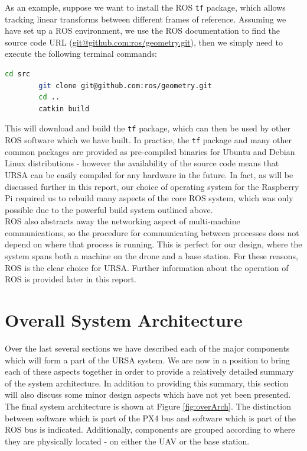 \documentclass[capstone_report.tex]{subfiles}
\begin{document}
    As an example, suppose we want to install the ROS \texttt{tf} package, which allows tracking linear transforms between different frames of reference. Assuming we have set up a ROS environment, we use the ROS documentation to find the source code URL (\url{git@github.com:ros/geometry.git}), then we simply need to execute the following terminal commands:

    \begin{lstlisting}[language=bash]
    	cd src
    	git clone git@github.com:ros/geometry.git
    	cd ..
    	catkin build
	\end{lstlisting}

	This will download and build the \texttt{tf} package, which can then be used by other ROS software which we have built. In practice, the \texttt{tf} package and many other common packages are provided as pre-compiled binaries for Ubuntu and Debian Linux distributions - however the availability of the source code means that URSA can be easily compiled for any hardware in the future. In fact, as will be discussed further in this report, our choice of operating system for the Raspberry Pi required us to rebuild many aspects of the core ROS system, which was only possible due to the powerful build system outlined above.\\

	ROS also abstracts away the networking aspect of multi-machine communications, so the procedure for communicating between processes does not depend on where that process is running. This is perfect for our design, where the system spans both a machine on the drone and a base station. For these reasons, ROS is the clear choice for URSA. Further information about the operation of ROS is provided later in this report.

\section{Overall System Architecture}
	Over the last several sections we have described each of the major components which will form a part of the URSA system. We are now in a position to bring each of these aspects together in order to provide a relatively detailed summary of the system architecture. In addition to providing this summary, this section will also discuss some minor design aspects which have not yet been presented. The final system architecture is shown at Figure \ref{fig:overArch}. The distinction between software which is part of the PX4 bus and software which is part of the ROS bus is indicated. Additionally, components are grouped according to where they are physically located - on either the UAV or the base station. \\
\end{document}
